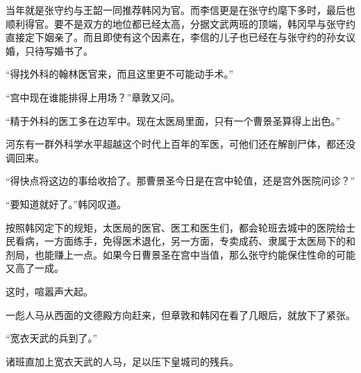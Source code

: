 当年就是张守约与王韶一同推荐韩冈为官。而李信更是在张守约麾下多时，最后也顺利得官。要不是双方的地位都已经太高，分据文武两班的顶端，韩冈早与张守约直接定下姻亲了。而且即使有这个因素在，李信的儿子也已经在与张守约的孙女议婚，只待写婚书了。

“得找外科的翰林医官来，而且这里更不可能动手术。”

“宫中现在谁能排得上用场？”章敦又问。

“精于外科的医工多在边军中。现在太医局里面，只有一个曹景圣算得上出色。”

河东有一群外科学水平超越这个时代上百年的军医，可他们还在解剖尸体，都还没调回来。

“得快点将这边的事给收拾了。那曹景圣今日是在宫中轮值，还是宫外医院问诊？”

“要知道就好了。”韩冈叹道。

按照韩冈定下的规矩，太医局的医官、医工和医生们，都会轮班去城中的医院给士民看病，一方面练手，免得医术退化，另一方面，专卖成药、隶属于太医局下的和剂局，也能赚上一点。如果今日曹景圣在宫中当值，那么张守约能保住性命的可能又高了一成。

这时，喧嚣声大起。

一彪人马从西面的文德殿方向赶来，但章敦和韩冈在看了几眼后，就放下了紧张。

“宽衣天武的兵到了。”

诸班直加上宽衣天武的人马，足以压下皇城司的残兵。

